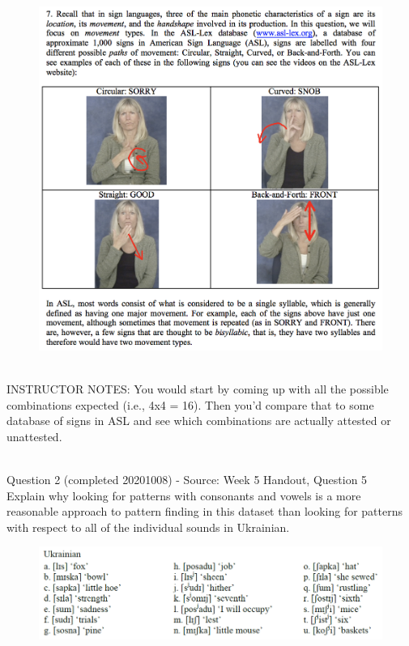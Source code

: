 \documentclass[12pt]{article}
\begin{document}
\begin{figure}[H]
\includegraphics{../images/ASL_movement.png}
\end{figure}

~\\
INSTRUCTOR NOTES: You would start by coming up with all the possible combinations expected (i.e., 4x4 = 16). Then you'd compare that to some database of signs in ASL and see which combinations are actually attested or unattested.


~\\

{\large Question 2} (completed 20201008) - Source: Week 5 Handout, Question 5\\

Explain why looking for patterns with consonants and vowels is a more reasonable approach to pattern finding in this dataset than looking for patterns with respect to all of the individual sounds in Ukrainian.\\

\begin{figure}[H]
\includegraphics{../images/ukrainian.png}
\end{figure}
\end{document}
